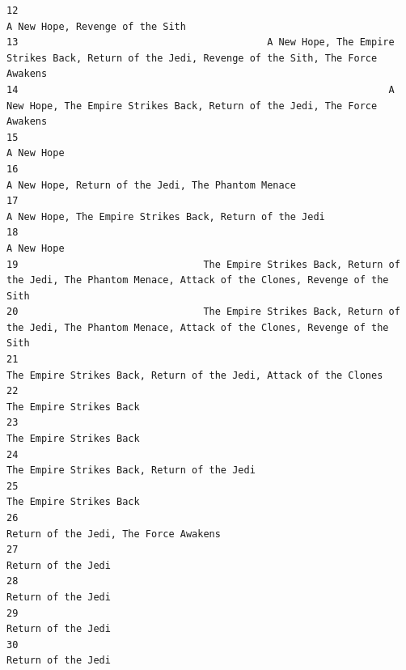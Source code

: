 \documentclass[
]{article}
\begin{document}
\begin{verbatim}
12                                                                                                           A New Hope, Revenge of the Sith
13                                           A New Hope, The Empire Strikes Back, Return of the Jedi, Revenge of the Sith, The Force Awakens
14                                                                A New Hope, The Empire Strikes Back, Return of the Jedi, The Force Awakens
15                                                                                                                                A New Hope
16                                                                                        A New Hope, Return of the Jedi, The Phantom Menace
17                                                                                   A New Hope, The Empire Strikes Back, Return of the Jedi
18                                                                                                                                A New Hope
19                                The Empire Strikes Back, Return of the Jedi, The Phantom Menace, Attack of the Clones, Revenge of the Sith
20                                The Empire Strikes Back, Return of the Jedi, The Phantom Menace, Attack of the Clones, Revenge of the Sith
21                                                                         The Empire Strikes Back, Return of the Jedi, Attack of the Clones
22                                                                                                                   The Empire Strikes Back
23                                                                                                                   The Empire Strikes Back
24                                                                                               The Empire Strikes Back, Return of the Jedi
25                                                                                                                   The Empire Strikes Back
26                                                                                                     Return of the Jedi, The Force Awakens
27                                                                                                                        Return of the Jedi
28                                                                                                                        Return of the Jedi
29                                                                                                                        Return of the Jedi
30                                                                                                                        Return of the Jedi

\end{verbatim}
\end{document}

